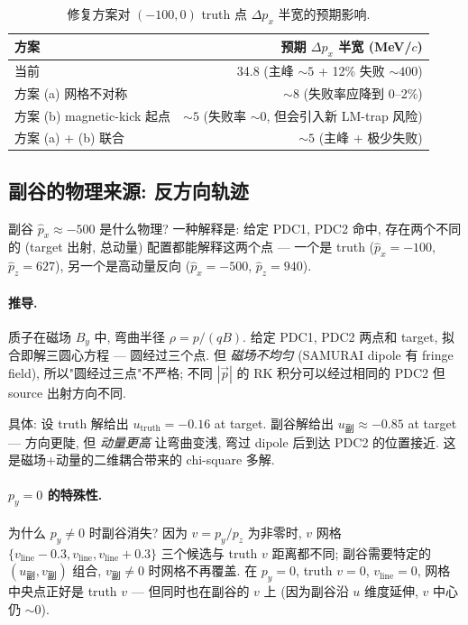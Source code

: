 \begin{table}[H]
\centering\small
\caption{修复方案对 $(-100, 0)$ truth 点 $\Delta p_x$ 半宽的预期影响.}
\label{tab:partIII:basin_fix_table}
\begin{tabular}{lr}
\toprule
方案 & 预期 $\Delta p_x$ 半宽 (MeV/$c$) \\
\midrule
当前 & 34.8 (主峰 $\sim 5$ + 12\% 失败 $\sim 400$) \\
方案 (a) 网格不对称 & $\sim 8$ (失败率应降到 0--2\%) \\
方案 (b) magnetic-kick 起点 & $\sim 5$ (失败率 $\sim 0$, 但会引入新 LM-trap 风险) \\
方案 (a) + (b) 联合 & $\sim 5$ (主峰 + 极少失败) \\
\bottomrule
\end{tabular}
\end{table}

\subsection{副谷的物理来源: 反方向轨迹}
\label{sec:partIII:basin:reverse_trajectory}

副谷 $\hat p_x \approx -500$ 是什么物理? 一种解释是: 给定 PDC1, PDC2 命中, 存在两个不同的 (target 出射, 总动量) 配置都能解释这两个点 — 一个是 truth ($\hat p_x = -100$, $\hat p_z = 627$), 另一个是高动量反向 ($\hat p_x = -500$, $\hat p_z = 940$).

\paragraph{推导.}
质子在磁场 $B_y$ 中, 弯曲半径 $\rho = p / (q B)$. 给定 PDC1, PDC2 两点和 target, 拟合即解三圆心方程 — 圆经过三个点. 但 \emph{磁场不均匀} (SAMURAI dipole 有 fringe field), 所以"圆经过三点"不严格; 不同 $|\vec p|$ 的 RK 积分可以经过相同的 PDC2 但 source 出射方向不同.

具体: 设 truth 解给出 $u_{\mathrm{truth}} = -0.16$ at target. 副谷解给出 $u_{\mathrm{副}} \approx -0.85$ at target — 方向更陡, 但 \emph{动量更高} 让弯曲变浅, 弯过 dipole 后到达 PDC2 的位置接近. 这是磁场+动量的二维耦合带来的 chi-square 多解.

\paragraph{$p_y = 0$ 的特殊性.}
为什么 $p_y \ne 0$ 时副谷消失? 因为 $v = p_y/p_z$ 为非零时, $v$ 网格 $\{v_{\mathrm{line}} - 0.3, v_{\mathrm{line}}, v_{\mathrm{line}} + 0.3\}$ 三个候选与 truth $v$ 距离都不同; 副谷需要特定的 $(u_{\mathrm{副}}, v_{\mathrm{副}})$ 组合, $v_{\mathrm{副}} \ne 0$ 时网格不再覆盖. 在 $p_y = 0$, truth $v = 0$, $v_{\mathrm{line}} = 0$, 网格中央点正好是 truth $v$ — 但同时也在副谷的 $v$ 上 (因为副谷沿 $u$ 维度延伸, $v$ 中心仍 $\sim 0$).


